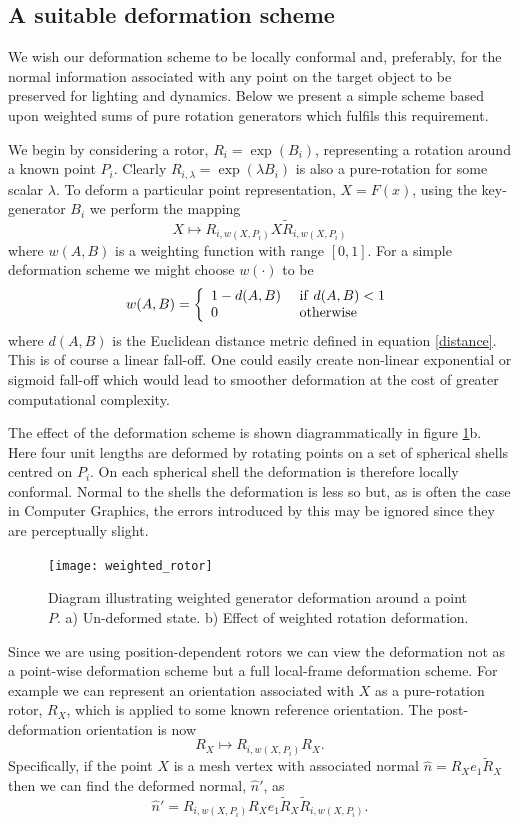 \subsection{A suitable deformation scheme}

We wish our deformation scheme to be locally conformal and, preferably, for the
normal information associated with any point on the target object to be preserved
for lighting and dynamics. Below we present a simple scheme based upon weighted sums
of pure rotation generators which fulfils this requirement.

We begin by considering a rotor, $R_i = \exp(B_i)$, representing a rotation around a 
known point $P_i$. Clearly $R_{i,\lambda} = \exp(\lambda B_i)$ is also a pure-rotation
for some scalar $\lambda$. To deform a particular
point representation, $X = F(x)$, using the key-generator $B_i$ we perform the mapping
\[
X \mapsto R_{i,w(X,P_i)}X\tilde{R}_{i,w(X,P_i)}
\]
where $w(A,B)$ is a weighting function with range $[0,1]$. For a simple deformation
scheme we might choose $w(\cdot)$ to be
\[
w(A,B) = \left\{
  \begin{array}{ll}
  1 - d(A,B) &{\rm ~if~} d(A,B) < 1\\
          0 & {\rm ~otherwise}
  \end{array}
  \right.
\]
where $d(A,B)$ is the Euclidean distance metric defined in equation \ref{distance}.
This is of course a linear fall-off. One could easily create non-linear exponential
or sigmoid fall-off which would lead to smoother deformation at the cost of greater
computational complexity.

The effect of the deformation scheme is shown diagrammatically in figure
\ref{fig:weighted_rotor}b. Here four unit lengths are deformed by rotating points
on a set of spherical shells centred on $P_i$. On each spherical shell the deformation
is therefore locally conformal. Normal to the shells the deformation is less so but,
as is often the case in Computer Graphics, the errors introduced by this
may be ignored since they are perceptually slight.

\begin{figure}
\centering
\texttt{[image: weighted\_rotor]}
\caption{\label{fig:weighted_rotor}%
  Diagram illustrating weighted generator deformation around a point $P$. 
          a) Un-deformed state. b) Effect of weighted rotation deformation.
}
\end{figure}

Since we are using position-dependent rotors we can view the deformation not as a point-wise 
deformation scheme but a full local-frame deformation scheme. For example we can represent an
orientation associated with $X$ as a pure-rotation rotor, $R_X$, which is applied to some known
reference orientation. The post-deformation orientation is now
\[
R_X \mapsto R_{i,w(X,P_i)}R_X.
\]
Specifically, if the point $X$ is a mesh vertex with associated normal
$\hat{n} = R_Xe_1\tilde{R}_X$ then we can find the deformed normal, $\hat{n}'$, as
\[
\hat{n}' = R_{i,w(X,P_i)}R_Xe_1\tilde{R}_X\tilde{R}_{i,w(X,P_i)}.
\]

